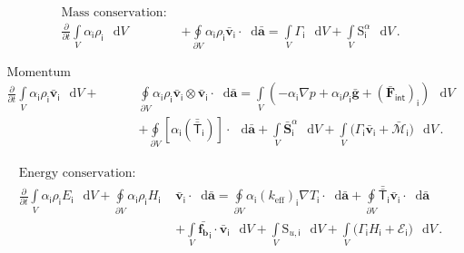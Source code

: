 \documentclass[paper=a4,12pt,titlepage,listof=totoc,index=totoc,bibliography=totoc]{scrartcl}
\newcommand{\pderiv}[2]{\ensuremath{\displaystyle\frac{\partial{#1}}{\partial{#2}}}}
\newcommand{\vect}[1]{\bm{\bar{#1}}}    %
\newcommand{\tens}[1]{\bm{\bar{\bar{\mathsf{#1}}}}}
\newcommand{\integ}[2]{\ensuremath{\displaystyle\int\limits_{#1}^{#2}}}
\newcommand{\ointeg}[2]{\ensuremath{\displaystyle\oint\limits_{#1}^{#2}}}
\newcommand*\diff{\mathop{}\!\mathrm{d}}
\newcommand{\ind}[1]{\ensuremath{\mathsf {#1}}}
\begin{document}
 \begin{equation*}\label{eq:emp-mass}
 \begin{split}
\text{Mass conservation: }& \\  
\pderiv{}{t}
\integ{V}{} \alpha_{\ind{i}} \rho_{\ind{i}} \,\diff{V}
&+ \ointeg{\partial V}{} \alpha_{\ind{i}} \rho_{\ind{i}} \vect{v}_{\ind{i}} \cdot \diff{\vect{a}} = 
\integ{V}{} \Gamma_{\ind{i}} \,\diff{V}
+ \integ{V}{} \mathrm{S}^{\alpha}_{\ind{i}} \,\diff{V}\,.
\end{split}
\end{equation*}

\begin{equation*}\label{eq:emp-mom}
\begin{split}
\text{Momentum conservation: }& \\  
\pderiv{}{t}
\integ{V}{} \alpha_{\ind{i}} \rho_{\ind{i}} \vect{v}_{\ind{i}} \,\diff{V}
+ &\ointeg{\partial V}{} \alpha_{\ind{i}} \rho_{\ind{i}} \vect{v}_{\ind{i}} \otimes \vect{v}_{\ind{i}} \cdot \diff{\vect{a}}
=  
\integ{V}{} \left(-\alpha_{\ind{i}} \nabla p 
+ \alpha_{\ind{i}} \rho_{\ind{i}} \vect{g}
+ (\vect{F}_{\ind{int}})_{\ind{i}} \right) \,\diff{V}\\
&+ \ointeg{\partial V}{} \left[ \alpha_{\ind{i}} \left( \tens{T}_{\ind{i}}\right) \right] \cdot \,\diff{\vect{a}}
+ \integ{V}{} \vect{S}^{\alpha}_{\ind{i}} \,\diff{V}
+ \integ{V}{} \bigl(\Gamma_{\ind{i}} \vect{v}_{\ind{i}} + \vect{\mathcal{M}}_{\ind{i}}\bigr)  \,\diff{V}\,.
\end{split}
\end{equation*}

\begin{align*}\label{eq:emp-en}
\begin{split}
\text{Energy conservation: }\qquad&\\  
\pderiv{}{t}
\integ{V}{} \alpha_{\ind{i}} \rho_{\ind{i}} E_{\ind{i}} \,\diff{V}
+ \ointeg{\partial V}{} \alpha_{\ind{i}} \rho_{\ind{i}} H_{\ind{i}}&
\vect{v}_{\ind{i}} \cdot \diff{\vect{a}}
  = 
\ointeg{\partial V}{} \alpha_{\ind{i}} (k_{\mathrm{eff}})_{\ind{i}} \nabla T_{\ind{i}} \cdot \diff{\vect{a}}
+ \ointeg{\partial V}{} \tens{T}_{\ind{i}} \vect{v}_{\ind{i}} \cdot \diff{\vect{a}}\nonumber \\
& + \integ{V}{} \vect{f_{b}}_{\ind{i}} \cdot \vect{v}_{\ind{i}} \,\diff{V}
+ \integ{V}{} \mathrm{S}_{u,\ind{i}} \,\diff{V} + \integ{V}{} \bigl(\Gamma_{\ind{i}}H_{\ind{i}} + \mathcal{E}_{\ind{i}}\bigr)\,\diff{V}\,.
\end{split}
\end{align*} 
\end{document}
